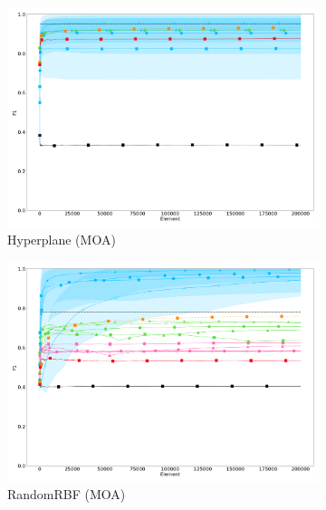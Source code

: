 \begin{figure}
\begin{subfigure}[t]{.49\linewidth}
		\label{fig:f1-drift}
	\end{subfigure}\\
	\begin{subfigure}[t]{.49\linewidth}
		\includegraphics[width=\linewidth]{figures/results/dataset_1_f1_std.png}
		\caption{Hyperplane (MOA)}
		\label{fig:f1-dataset_1}
	\end{subfigure}
	\begin{subfigure}[t]{.49\linewidth}
		\includegraphics[width=\linewidth]{figures/results/dataset_2_f1_std.png}
		\caption{RandomRBF (MOA)}
		\label{fig:f1-dataset_2}
	\end{subfigure}\\
	\begin{subfigure}[t]{.49\linewidth}

\end{subfigure}
\end{figure}
